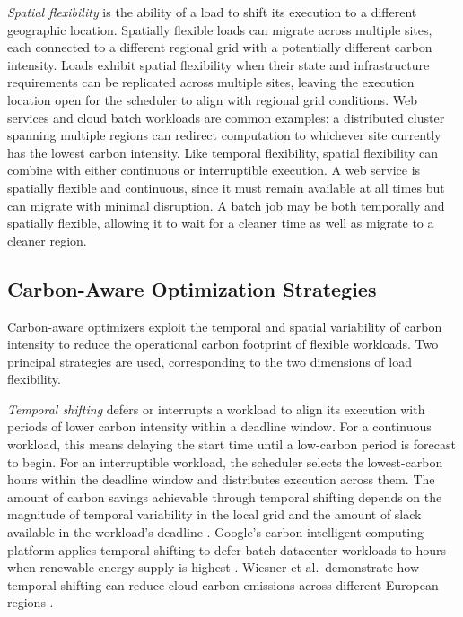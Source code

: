 \textit{Spatial flexibility} is the ability of a load to shift its execution to a different geographic location.
Spatially flexible loads can migrate across multiple sites, each connected to a different regional grid with a potentially different carbon intensity.
Loads exhibit spatial flexibility when their state and infrastructure requirements can be replicated across multiple sites, leaving the execution location open for the scheduler to align with regional grid conditions.
Web services and cloud batch workloads are common examples: a distributed cluster spanning multiple regions can redirect computation to whichever site currently has the lowest carbon intensity.
Like temporal flexibility, spatial flexibility can combine with either continuous or interruptible execution. 
A web service is spatially flexible and continuous, since it must remain available at all times but can migrate with minimal disruption.
A batch job may be both temporally and spatially flexible, allowing it to wait for a cleaner time as well as migrate to a cleaner region.


\subsection{Carbon-Aware Optimization Strategies}

Carbon-aware optimizers exploit the temporal and spatial variability of carbon intensity to reduce the operational carbon footprint of flexible workloads.
Two principal strategies are used, corresponding to the two dimensions of load flexibility.

\textit{Temporal shifting} defers or interrupts a workload to align its execution with periods of lower carbon intensity within a deadline window.
For a continuous workload, this means delaying the start time until a low-carbon period is forecast to begin.
For an interruptible workload, the scheduler selects the lowest-carbon hours within the deadline window and distributes execution across them.
The amount of carbon savings achievable through temporal shifting depends on the magnitude of temporal variability in the local grid and the amount of slack available in the workload's deadline \cite{sukprasert_limitations_2024}.
Google's carbon-intelligent computing platform applies temporal shifting to defer batch datacenter workloads to hours when renewable energy supply is highest \cite{google_data_center_work_harder}.
Wiesner et al.\ demonstrate how temporal shifting can reduce cloud carbon emissions across different European regions \cite{wiesner_lets_2021}.

